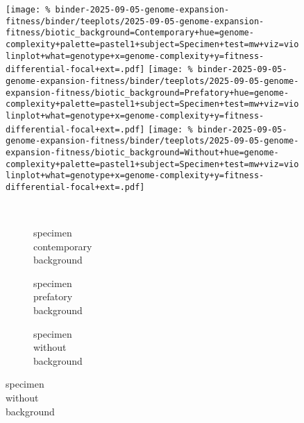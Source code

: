 \begin{figure}

\begin{minipage}{\linewidth}
\texttt{[image: \%
binder-2025-09-05-genome-expansion-fitness/binder/teeplots/2025-09-05-genome-expansion-fitness/biotic\_background=Contemporary+hue=genome-complexity+palette=pastel1+subject=Specimen+test=mw+viz=violinplot+what=genotype+x=genome-complexity+y=fitness-differential-focal+ext=.pdf]}
\texttt{[image: \%
binder-2025-09-05-genome-expansion-fitness/binder/teeplots/2025-09-05-genome-expansion-fitness/biotic\_background=Prefatory+hue=genome-complexity+palette=pastel1+subject=Specimen+test=mw+viz=violinplot+what=genotype+x=genome-complexity+y=fitness-differential-focal+ext=.pdf]}%
\texttt{[image: \%
binder-2025-09-05-genome-expansion-fitness/binder/teeplots/2025-09-05-genome-expansion-fitness/biotic\_background=Without+hue=genome-complexity+palette=pastel1+subject=Specimen+test=mw+viz=violinplot+what=genotype+x=genome-complexity+y=fitness-differential-focal+ext=.pdf]}

\vspace{-1ex}

\begin{subfigure}{0.135\linewidth}
~
\end{subfigure}%
\begin{subfigure}{0.305\linewidth}
    \centering
    \caption{\footnotesize specimen\\contemporary\\background}
    \label{fig:fitness-gcomplexity:specimen-contemporary}
\end{subfigure}%
\begin{subfigure}{0.305\linewidth}
    \centering
    \caption{\footnotesize specimen\\prefatory\\background}
    \label{fig:fitness-gcomplexity:specimen-prefatory}
\end{subfigure}%
\begin{subfigure}{0.255\linewidth}
    \centering
    \caption{\footnotesize specimen\\without\\background}
    \label{fig:fitness-gcomplexity:specimen-without}
\end{subfigure}
\end{minipage}


\end{figure}
